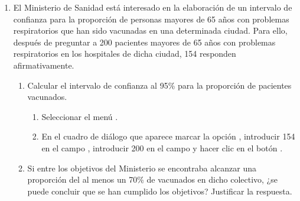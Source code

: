 \begin{enumerate}[leftmargin=*]
\item El Ministerio de Sanidad está interesado en la elaboración de un intervalo de confianza para la proporción de
personas mayores de 65 años con problemas respiratorios que han sido vacunadas en una determinada ciudad. Para ello,
después de preguntar a 200 pacientes mayores de 65 años con problemas respiratorios en los hospitales de dicha ciudad,
154 responden afirmativamente.
\begin{enumerate}
\item Calcular el intervalo de confianza al 95\% para la proporción de pacientes vacunados.
\begin{indicacion}
\begin{enumerate}
\item Seleccionar el menú .
\item En el cuadro de diálogo que aparece marcar la opción , introducir 154 en el campo , introducir 200 en el campo  y hacer clic en el botón .
\end{enumerate}
\end{indicacion}

\item Si entre los objetivos del Ministerio se encontraba alcanzar una proporción del al menos un 70\% de vacunados en
dicho colectivo, ¿se puede concluir que se han cumplido los objetivos? Justificar la respuesta.
\end{enumerate}
\end{enumerate}


